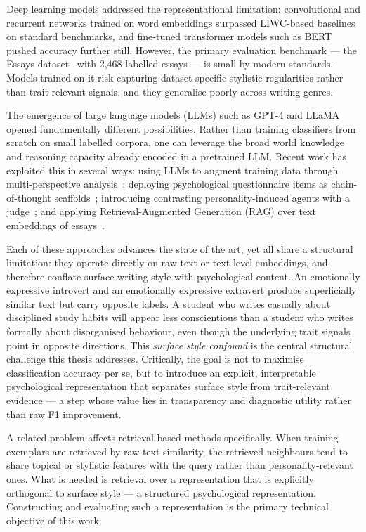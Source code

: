 \documentclass[../main.tex]{subfiles}
\begin{document}
Deep learning models addressed the representational limitation: convolutional and recurrent networks trained on word embeddings surpassed LIWC-based baselines on standard benchmarks, and fine-tuned transformer models such as BERT pushed accuracy further still. However, the primary evaluation benchmark --- the Essays dataset~\cite{pennebaker1999linguistic} with 2,468 labelled essays --- is small by modern standards. Models trained on it risk capturing dataset-specific stylistic regularities rather than trait-relevant signals, and they generalise poorly across writing genres.

The emergence of large language models (LLMs) such as GPT-4 and LLaMA opened fundamentally different possibilities. Rather than training classifiers from scratch on small labelled corpora, one can leverage the broad world knowledge and reasoning capacity already encoded in a pretrained LLM. Recent work has exploited this in several ways: using LLMs to augment training data through multi-perspective analysis~\cite{hu2024llm}; deploying psychological questionnaire items as chain-of-thought scaffolds~\cite{yang2023psycot}; introducing contrasting personality-induced agents with a judge~\cite{yeo2025pado}; and applying Retrieval-Augmented Generation (RAG) over text embeddings of essays~\cite{ma2025post}.

Each of these approaches advances the state of the art, yet all share a structural limitation: they operate directly on raw text or text-level embeddings, and therefore conflate surface writing style with psychological content. An emotionally expressive introvert and an emotionally expressive extravert produce superficially similar text but carry opposite labels. A student who writes casually about disciplined study habits will appear less conscientious than a student who writes formally about disorganised behaviour, even though the underlying trait signals point in opposite directions. This \emph{surface style confound} is the central structural challenge this thesis addresses. Critically, the goal is not to maximise classification accuracy per se, but to introduce an explicit, interpretable psychological representation that separates surface style from trait-relevant evidence --- a step whose value lies in transparency and diagnostic utility rather than raw F1 improvement.

A related problem affects retrieval-based methods specifically. When training exemplars are retrieved by raw-text similarity, the retrieved neighbours tend to share topical or stylistic features with the query rather than personality-relevant ones. What is needed is retrieval over a representation that is explicitly orthogonal to surface style --- a structured psychological representation. Constructing and evaluating such a representation is the primary technical objective of this work.
\end{document}
